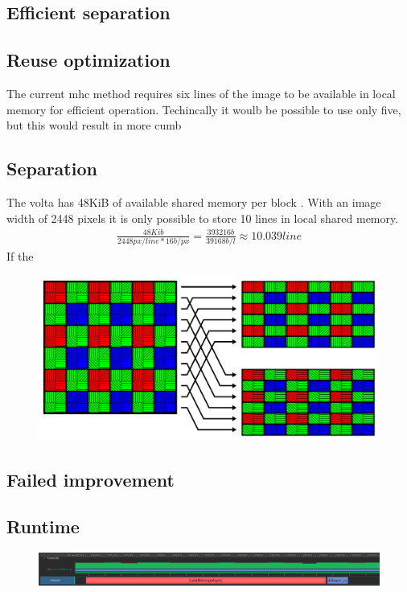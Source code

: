 \subsection{Efficient separation}


\subsection{Reuse optimization}
The current \gls{mhc} method requires six lines of the image to be available in local memory for efficient operation.
Techincally it woulb be possible to use only five, but this would result in more cumb

\subsection{Separation}
The \gls{volta} has 48KiB of available shared memory per block \cite{rigerunNVIDIAJetsonXavier2023}.
With an image width of 2448 pixels \cite{lucidvisionlabsTriton0MPPolarization} it is only possible to store 10 lines in local shared memory.
\begin{align}
    \frac{48Kib}{2448px/line * 16b/px} = \frac{393216b}{39168b/l} \approx 10.039line
\end{align}
If the

\begin{figure}[H]
    \centering
    \includegraphics[width=\textwidth]{figures/debayer/separation.pdf}
\end{figure}
\subsection{Failed improvement}

\subsection{Runtime}
\begin{figure}[H]
    \centering
    \includegraphics[width=\textwidth]{figures/memory_comparaison.png}
\end{figure}

